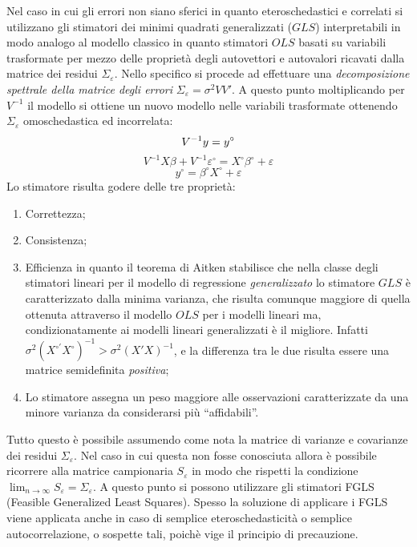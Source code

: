 \documentclass[a4page, 11pt]{article} %
\begin{document}
Nel caso in cui gli errori non siano sferici in quanto eteroschedastici e correlati si utilizzano gli stimatori dei minimi quadrati generalizzati ($GLS$) interpretabili in modo analogo al modello classico in quanto stimatori $OLS$ basati su variabili trasformate per mezzo delle proprietà degli autovettori e autovalori ricavati dalla matrice dei residui $\Sigma_\varepsilon$.
Nello specifico si procede ad effettuare una \textit{decomposizione spettrale della matrice degli errori} $\Sigma_\varepsilon = \sigma^2 VV'$. A questo punto moltiplicando per $V^{-1}$ il modello si ottiene un nuovo modello nelle variabili trasformate ottenendo $\Sigma_\varepsilon$ omoschedastica ed incorrelata:
\begin{equation*}
V^{-1}y = y^\circ \\
\end{equation*}
\begin{equation*}
V^{-1}X\beta + V^{-1}\varepsilon^\circ = X^\circ\beta^\circ + \varepsilon
\end{equation*}
\begin{equation*}
y^\circ = \beta^\circ X^\circ + \varepsilon
\end{equation*}
Lo stimatore risulta godere delle tre proprietà:
\begin{enumerate}[noitemsep]
\item Correttezza;
\item Consistenza;
\item Efficienza in quanto il teorema di Aitken stabilisce che nella classe degli stimatori lineari per il modello di regressione \textit{generalizzato} lo stimatore $GLS$ è caratterizzato dalla minima varianza, che risulta comunque maggiore di quella ottenuta attraverso il modello $OLS$ per i modelli lineari ma, condizionatamente ai modelli lineari generalizzati è il migliore. Infatti $\sigma^2 (X^{\circ '}X^{\circ})^{-1} >\sigma^2 (X'X)^{-1}$, e la differenza tra le due risulta essere una matrice semidefinita \textit{positiva};
\item Lo stimatore assegna un peso maggiore alle osservazioni caratterizzate da una minore varianza da considerarsi più ``affidabili''.
\end{enumerate}
Tutto questo è possibile assumendo come nota la matrice di varianze e covarianze dei residui $\Sigma_\varepsilon$. Nel caso in cui questa non fosse conosciuta allora è possibile ricorrere alla matrice campionaria $S_\varepsilon$ in modo che rispetti la condizione $\lim_{n\to \infty}{S_\varepsilon = \Sigma_\varepsilon}$. A questo punto si possono utilizzare gli stimatori FGLS (Feasible Generalized Least Squares). Spesso la soluzione di applicare i FGLS viene applicata anche in caso di semplice eteroschedasticità o semplice autocorrelazione, o sospette tali, poichè vige il principio di precauzione.
\end{document}
